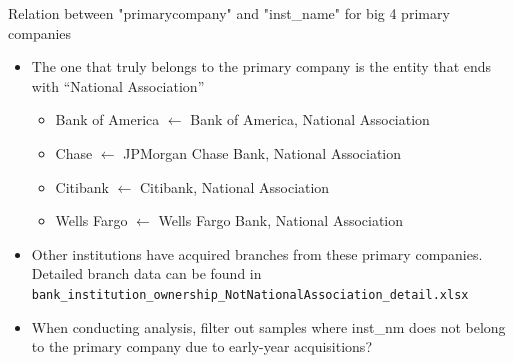 \documentclass{beamer}
\begin{document}
\begin{frame}{Relation between "primarycompany" and "inst\_name" for big 4 primary companies}

\begin{itemize}
    \item The one that truly belongs to the primary company is the entity that ends with “National Association”
    \begin{itemize}
        \item Bank of America $\leftarrow$ Bank of America, National Association
\item Chase $\leftarrow$ JPMorgan Chase Bank, National Association
\item Citibank $\leftarrow$ Citibank, National Association
\item Wells Fargo $\leftarrow$ Wells Fargo Bank, National Association
    \end{itemize}
    \item Other institutions have acquired branches from these primary companies. Detailed branch data can be found in {\footnotesize \texttt{bank\_institution\_ownership\_NotNationalAssociation\_detail.xlsx}}
    \item When conducting analysis, filter out samples where inst\_nm does not belong to the primary company due to early-year acquisitions?
\end{itemize}

\end{frame}
\end{document}
